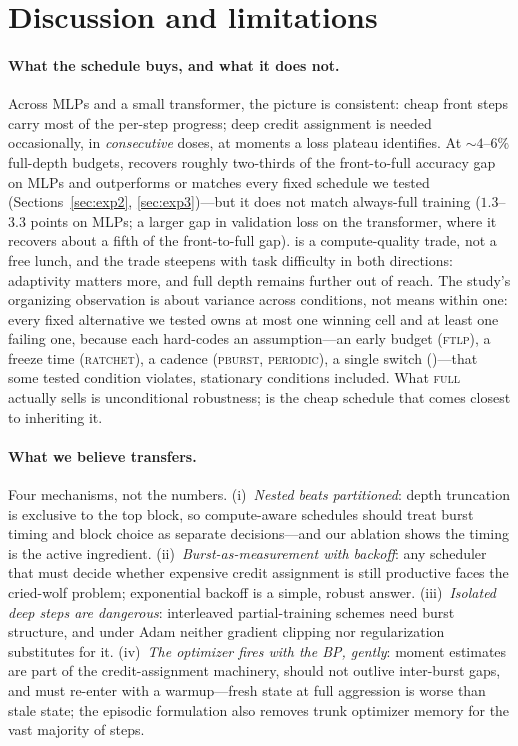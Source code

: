 \section{Discussion and limitations}
\label{sec:discussion}

\paragraph{What the schedule buys, and what it does not.} Across MLPs and a
small transformer, the picture is consistent: cheap front steps carry most
of the per-step progress; deep credit assignment is needed occasionally, in
\emph{consecutive} doses, at moments a loss plateau identifies. At
${\sim}4$--$6\%$ full-depth budgets, \fw{} recovers roughly two-thirds of the
front-to-full accuracy gap on MLPs and outperforms or matches every fixed
schedule we tested (Sections~\ref{sec:exp2}, \ref{sec:exp3})---but it does
not match always-full training
($1.3$--$3.3$ points on MLPs; a larger gap in validation loss on the
transformer, where it recovers about a fifth of the front-to-full gap). \fw{}
is a compute-quality trade, not a free lunch, and the trade steepens with
task difficulty in both directions: adaptivity matters more, and full depth
remains further out of reach. The study's organizing observation is about
variance across conditions, not means within one: every fixed alternative
we tested owns at most one winning cell and at least one failing one,
because each hard-codes an assumption---an early budget (\textsc{ftlp}), a
freeze time (\textsc{ratchet}), a cadence (\textsc{pburst},
\textsc{periodic}), a single switch (\lpft{})---that some tested condition
violates, stationary conditions included. What \textsc{full} actually
sells is unconditional robustness; \fw{} is the cheap schedule that comes
closest to inheriting it.

\paragraph{What we believe transfers.} Four mechanisms, not the numbers.
(i)~\emph{Nested beats partitioned}: depth truncation is exclusive to the
top block, so compute-aware schedules should treat burst timing and block
choice as separate decisions---and our ablation shows the timing is the
active ingredient. (ii)~\emph{Burst-as-measurement with backoff}: any
scheduler that must decide whether expensive credit assignment is still
productive faces the cried-wolf problem; exponential backoff is a simple,
robust answer. (iii)~\emph{Isolated deep steps are dangerous}: interleaved
partial-training schemes need burst structure, and under Adam neither
gradient clipping nor regularization substitutes for it. (iv)~\emph{The
optimizer fires with the BP, gently}: moment estimates are part of the
credit-assignment machinery, should not outlive inter-burst gaps, and must
re-enter with a warmup---fresh state at full aggression is worse than stale
state; the episodic formulation also removes trunk optimizer memory for the
vast majority of steps.

